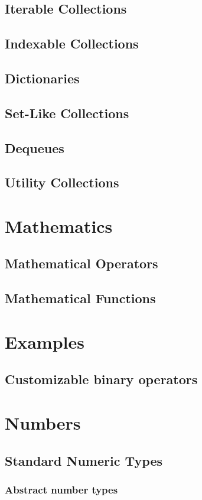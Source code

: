     \section{Iterable Collections}
    \section{Indexable Collections}
    \section{Dictionaries}
    \section{Set-Like Collections}
    \section{Dequeues}
    \section{Utility Collections}
\chapter{Mathematics}
    \section{Mathematical Operators}
    \section{Mathematical Functions}
\chapter{Examples}
    \section{Customizable binary operators}
\chapter{Numbers}
    \section{Standard Numeric Types}
    \subsection{Abstract number types}
